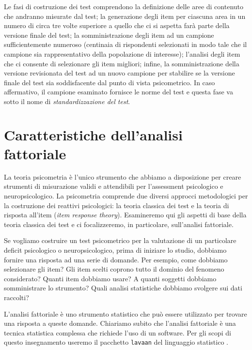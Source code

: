 \documentclass[
  11pt,
]{krantz}
\theoremstyle{definition}
\theoremstyle{definition}
\theoremstyle{definition}
\theoremstyle{definition}
\theoremstyle{remark}
\begin{document}
Le fasi di costruzione dei test comprendono la definizione delle aree di contenuto che andranno misurate dal test; la generazione degli item per ciascuna area in un numero di circa tre volte superiore a quello che ci si aspetta farà parte della versione finale del test; la somministrazione degli item ad un campione sufficientemente numeroso (centinaia di rispondenti selezionati in modo tale che il campione sia rappresentativo della popolazione di interesse); l'analisi degli item che ci consente di selezionare gli item migliori; infine, la somministrazione della versione revisionata del test ad un nuovo campione per stabilire se la versione finale del test sia soddisfacente dal punto di vista psicometrico. In caso affermativo, il campione esaminato fornisce le norme del test e questa fase va sotto il nome di \emph{standardizzazione del test}.

\hypertarget{caratteristiche-dellanalisi-fattoriale}{%
\section{Caratteristiche dell'analisi fattoriale}\label{caratteristiche-dellanalisi-fattoriale}}

La teoria psicometria è l'unico strumento che abbiamo a disposizione per creare strumenti di misurazione validi e attendibili per l'assessment psicologico e neuropsicologico. La psicometria comprende due diversi approcci metodologici per la costruzione dei reattivi psicologici: la teoria classica dei test e la teoria di risposta all'item (\emph{item response theory}). Esamineremo qui gli aspetti di base della teoria classica dei test e ci focalizzeremo, in particolare, sull'analisi fattoriale.

Se vogliamo costruire un test psicometrico per la valutazione di un particolare deficit psicologico o neuropsicologico, prima di iniziare lo studio, dobbiamo fornire una risposta ad una serie di domande. Per esempio, come dobbiamo selezionare gli item? Gli item scelti coprono tutto il dominio del fenomeno considerato? Quanti item dobbiamo usare? A quanti soggetti dobbiamo somministrare lo strumento? Quali analisi statistiche dobbiamo svolgere sui dati raccolti?

L'analisi fattoriale è uno strumento statistico che può essere utilizzato per trovare una risposta a queste domande. Chiariamo subito che l'analisi fattoriale è una tecnica statistica complessa che richiede l'uso di un software. Per gli scopi di questo insegnamento useremo il pacchetto \texttt{lavaan} del linguaggio statistico .
\end{document}
